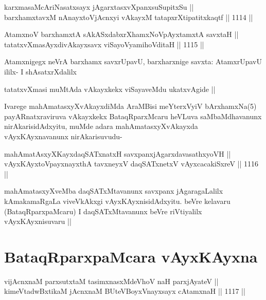 \begin{shl}
karxmasaMcAriNasatxsayx jAgarxtasxvXpanxsuSupitxSu || \\
barxhamxtavxM nAnayxtoV\s jAcnxyi vAkayxM tatapxrXtipatitxkaqtf ||  1114 ||  
\end{shl}
				
\begin{shl}
AtamxnoV barxhamxtA sAkASxdabxrXhamxNoV\s pAyxtamxtA savxtaH ||  \\
tatatxvXmasAyxdivAkayxsavx viSayoV\s yamihoVditaH ||  1115 || 
\end{shl}

\begin{artha}
Atamxnigegx neVrA barxhamx savxrUpavU, barxharxnige savxta: AtamxrUpavU ililx- I shAsatxrXdalilx
\end{artha}

\begin{artha}
tatatxvXmasi muMtAda vAkayxkekx viSayaveMdu ukatxvAgide ||
\end{artha}

\begin{artha}
Ivarege mahAmatasxyXvAkayxdiMda AraMBisi meYterxVyiV bArxhamxNa(5) payARnatxraviruva vAkayxkekx BataqRparxMcaru heVLuva saMbaMdhavanunx nirAkarisidAdxyitu, muMde adara mahAmatasxyXvAkayxda vAyxKAyxnavanunx nirAkarisuvudu-
\end{artha}

\begin{shl}
mahAmatAsxyXKayxdaqSATxnatxH savxpanxjAgarxdavasathxyoVH || \\
vAyxKAyxtoV\s payxnayxthA tavxneyxV daqSATxnetxV vAyxcacakiSxreV ||  1116 ||  
\end{shl}

\begin{artha}
mahAmatasxyXveMba daqSATxMtavanunx savxpanx jAgaragaLalilx kAmakamaRgaLa viveVkAkxgi vAyxKAyxnisidAdxyitu. beVre kelavaru (BataqRparxpaMcaru) I daqSATxMtavanunx beVre riVtiyalilx vAyxKAyxnisuvaru ||
\end{artha}

\section*{BataqRparxpaMcara vAyxKAyxna}



\begin{shl}
vijAcnxnaM parxsutxtaM tasimxnasxMdeVhoV naH parxjAyateV || \\
kimeVtadwBxtikaM jAcnxnaM BUteVBoyxV\s nayxsayx cA\s \s tamxnaH ||  1117 ||  
\end{shl}

